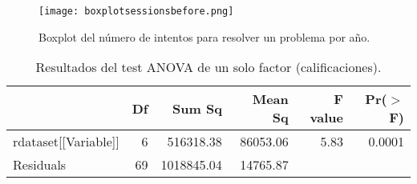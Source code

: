 \begin{figure}[H]
    \centering
    \texttt{[image: boxplotsessionsbefore.png]}
    \caption{Boxplot del número de intentos para resolver un problema por año.}
    \label{fig:boxplotsessionsbefore}
\end{figure}

\begin{table}[H]
\centering
\caption{Resultados del test ANOVA de un solo factor (calificaciones).}
\label{tab:ANOVAsessionsbefore}
\begin{tabular}{lrrrrr}
  \hline
 & Df & Sum Sq & Mean Sq & F value & Pr($>$F) \\ 
  \hline
rdataset[[Variable]] & 6 & 516318.38 & 86053.06 & 5.83 & 0.0001 \\ 
  Residuals            & 69 & 1018845.04 & 14765.87 &  &  \\ 
   \hline
\end{tabular}
\end{table}

